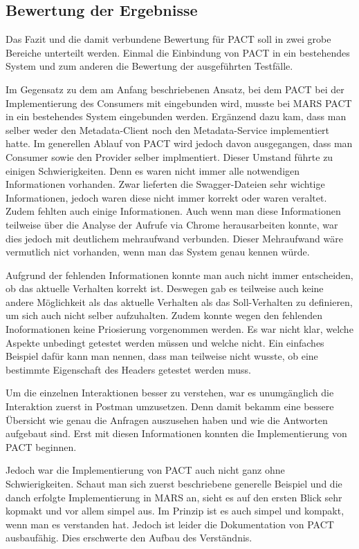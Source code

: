 \documentclass{llncs}
\begin{document}
\subsection{Bewertung der Ergebnisse}
Das Fazit und die damit verbundene Bewertung für PACT soll in zwei grobe Bereiche unterteilt werden. Einmal die Einbindung von PACT in ein bestehendes System und zum anderen die Bewertung der ausgeführten Testfälle.

Im Gegensatz zu dem am Anfang beschriebenen Ansatz, bei dem PACT bei der Implementierung des Consumers mit eingebunden wird, musste bei MARS PACT in ein bestehendes System eingebunden werden. Ergänzend dazu kam, dass man selber weder den Metadata-Client noch den Metadata-Service implementiert hatte. Im generellen Ablauf von PACT wird jedoch davon ausgegangen, dass man Consumer sowie den Provider selber implmentiert. Dieser Umstand führte zu einigen Schwierigkeiten.
Denn es waren nicht immer alle notwendigen Informationen vorhanden. Zwar lieferten die Swagger-Dateien sehr wichtige Informationen, jedoch waren diese nicht immer korrekt oder waren veraltet. Zudem fehlten auch einige Informationen. Auch wenn man diese Informationen teilweise über die Analyse der Aufrufe via Chrome herausarbeiten konnte, war dies jedoch mit deutlichem mehraufwand verbunden. Dieser Mehraufwand wäre vermutlich nict vorhanden, wenn man das System genau kennen würde.

Aufgrund der fehlenden Informationen konnte man auch nicht immer entscheiden, ob das aktuelle Verhalten korrekt ist. Deswegen gab es teilweise auch keine andere Möglichkeit als das aktuelle Verhalten als das Soll-Verhalten zu definieren, um sich auch nicht selber aufzuhalten. Zudem konnte wegen den fehlenden Inoformationen keine Priosierung vorgenommen werden. Es war nicht klar, welche Aspekte unbedingt getestet werden müssen und welche nicht. Ein einfaches Beispiel dafür kann man nennen, dass man teilweise nicht wusste, ob eine bestimmte Eigenschaft des Headers getestet werden muss.

Um die einzelnen Interaktionen besser zu verstehen, war es unumgänglich die Interaktion zuerst in Postman umzusetzen. Denn damit bekamm eine bessere Übersicht wie genau die Anfragen auszusehen haben und wie die Antworten aufgebaut sind. Erst mit diesen Informationen konnten die Implementierung von PACT beginnen.

Jedoch war die Implementierung von PACT auch nicht ganz ohne Schwierigkeiten. Schaut man sich zuerst beschriebene generelle Beispiel und die danch erfolgte Implementierung in MARS an, sieht es auf den ersten Blick sehr kopmakt und vor allem simpel aus. Im Prinzip ist es auch simpel und kompakt, wenn man es verstanden hat. Jedoch ist leider die Dokumentation von PACT ausbaufähig. Dies erschwerte den Aufbau des Verständnis.
\end{document}
